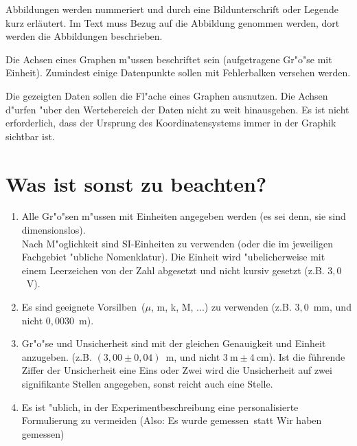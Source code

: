 \documentclass[a4paper,11pt]{article}
\begin{document}
Abbildungen werden nummeriert und durch eine Bildunterschrift oder
Legende kurz erläutert. Im Text muss Bezug auf die Abbildung 
genommen werden, dort werden die Abbildungen beschrieben. 

Die Achsen eines Graphen m"ussen beschriftet sein (aufgetragene Gr"o"se mit Einheit).
Zumindest einige Datenpunkte sollen mit Fehlerbalken versehen werden.

Die gezeigten Daten sollen die Fl"ache eines Graphen ausnutzen. Die Achsen d"urfen 
"uber den Wertebereich der Daten nicht zu weit hinausgehen. Es ist nicht
erforderlich, dass der Ursprung des Koordinatensystems immer in der Graphik sichtbar ist.

\section{Was ist sonst zu beachten?}
\begin{enumerate}
\item Alle Gr"o"sen m"ussen  mit Einheiten angegeben werden (es sei denn, sie sind dimensionslos).\\
      Nach M"oglichkeit sind SI-Einheiten zu verwenden (oder die im jeweiligen Fachgebiet 
      "ubliche Nomenklatur).
      Die Einheit wird "ubelicherweise mit einem Leerzeichen von der Zahl abgesetzt 
      und nicht kursiv gesetzt (z.B. $3,0$~V). 
\item Es sind geeignete \glqq Vorsilben\grqq\ ($\mu$, m, k, M, ...) zu verwenden 
      (z.B. $3,0$~mm, und nicht $0,0030$~m).
\item Gr"o"se und Unsicherheit sind mit der gleichen Genauigkeit und Einheit anzugeben.
      (z.B. $(3,00 \pm 0,04)$~m, und nicht $3~\mathrm{m}\pm 4~\mathrm{cm}$).\newline
      Ist die führende Ziffer der Unsicherheit eine Eins oder Zwei wird die Unsicherheit
      auf zwei signifikante Stellen angegeben, sonst reicht auch eine Stelle.
\item Es ist "ublich, in der Experimentbeschreibung eine personalisierte
      Formulierung zu vermeiden (Also: \glqq Es wurde gemessen\grqq\  
      statt \glqq Wir haben gemessen\grqq)
\end{enumerate}
\end{document}
